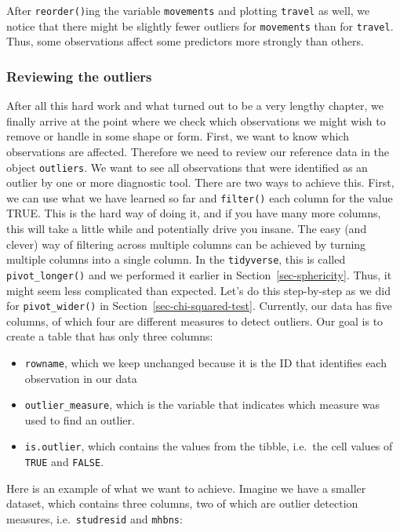 \documentclass[
  letterpaper,
  DIV=11,
  numbers=noendperiod]{scrreprt}
\begin{document}
After \texttt{reorder()}ing the variable \texttt{movements} and plotting
\texttt{travel} as well, we notice that there might be slightly fewer
outliers for \texttt{movements} than for \texttt{travel}. Thus, some
observations affect some predictors more strongly than others.

\subsubsection{Reviewing the outliers}\label{sec-reviewing-the-outliers}

After all this hard work and what turned out to be a very lengthy
chapter, we finally arrive at the point where we check which
observations we might wish to remove or handle in some shape or form.
First, we want to know which observations are affected. Therefore we
need to review our reference data in the object \texttt{outliers}. We
want to see all observations that were identified as an outlier by one
or more diagnostic tool. There are two ways to achieve this. First, we
can use what we have learned so far and \texttt{filter()} each column
for the value TRUE. This is the hard way of doing it, and if you have
many more columns, this will take a little while and potentially drive
you insane. The easy (and clever) way of filtering across multiple
columns can be achieved by turning multiple columns into a single
column. In the \texttt{tidyverse}, this is called
\texttt{pivot\_longer()} and we performed it earlier in
Section~\ref{sec-sphericity}. Thus, it might seem less complicated than
expected. Let's do this step-by-step as we did for
\texttt{pivot\_wider()} in Section~\ref{sec-chi-squared-test}.
Currently, our data has five columns, of which four are different
measures to detect outliers. Our goal is to create a table that has only
three columns:

\begin{itemize}
\item
  \texttt{rowname}, which we keep unchanged because it is the ID that
  identifies each observation in our data
\item
  \texttt{outlier\_measure}, which is the variable that indicates which
  measure was used to find an outlier.
\item
  \texttt{is.outlier}, which contains the values from the tibble,
  i.e.~the cell values of \texttt{TRUE} and \texttt{FALSE}.
\end{itemize}

Here is an example of what we want to achieve. Imagine we have a smaller
dataset, which contains three columns, two of which are outlier
detection measures, i.e.~\texttt{studresid} and \texttt{mhbns}:
\end{document}

